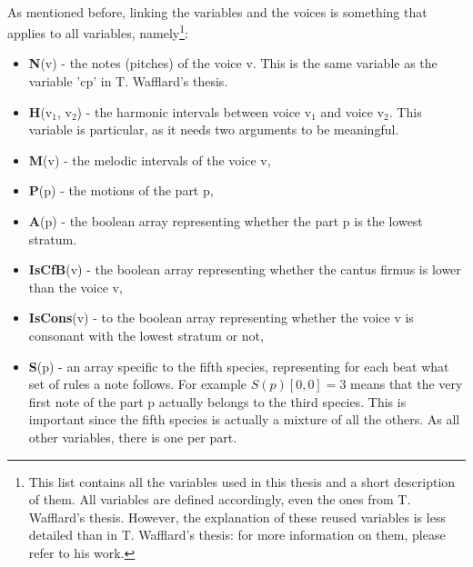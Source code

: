 \paragraph{}
\noindent As mentioned before, linking the variables and the voices is something that applies to all variables, namely\footnote{This list contains all the variables used in this thesis and a short description of them. All variables are defined accordingly, even the ones from T. Wafflard's thesis. However, the explanation of these reused variables is less detailed than in T. Wafflard's thesis: for more information on them, please refer to his work.}:
\begin{itemize}
    \item \textbf{N}(v) - the notes (pitches) of the voice v. This is the same variable as the variable 'cp' in T. Wafflard's thesis.
    \item \textbf{H}(v$_1$, v$_2$) - the harmonic intervals between voice v$_1$ and voice v$_2$. This variable is particular, as it needs two arguments to be meaningful.
    \item \textbf{M}(v) - the melodic intervals of the voice v, 
    \item \textbf{P}(p) - the motions of the part p,
    \item \textbf{A}(p) - the boolean array representing whether the part p is the lowest stratum.
    \item \textbf{IsCfB}(v) - the boolean array representing whether the cantus firmus is lower than the voice v,
    \item \textbf{IsCons}(v) - to the boolean array representing whether the voice v is consonant with the lowest stratum or not,
    \item \textbf{S}(p) - an array specific to the fifth species, representing for each beat what set of rules a note follows. For example $S(p)[0, 0]=3$ means that the very first note of the part p actually belongs to the third species. This is important since the fifth species is actually a mixture of all the others. As all other variables, there is one per part.
\end{itemize}

